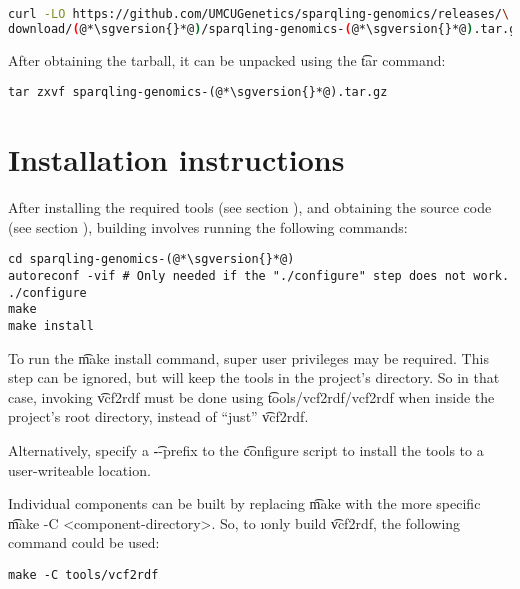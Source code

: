 \begin{lstlisting}[language=bash]
curl -LO https://github.com/UMCUGenetics/sparqling-genomics/releases/\
download/(@*\sgversion{}*@)/sparqling-genomics-(@*\sgversion{}*@).tar.gz
\end{lstlisting}

  After obtaining the tarball, it can be unpacked using the \t{tar}
  command:

\begin{lstlisting}
tar zxvf sparqling-genomics-(@*\sgversion{}*@).tar.gz
\end{lstlisting}

\section{Installation instructions}

  After installing the required tools (see section
  ), and obtaining the source code (see
  section \refer{sec:obtaining-tarball}), building involves running
  the following commands:

\begin{lstlisting}
cd sparqling-genomics-(@*\sgversion{}*@)
autoreconf -vif # Only needed if the "./configure" step does not work.
./configure
make
make install
\end{lstlisting}

  To run the \t{make install} command, super user privileges may be
  required.  This step can be ignored, but will keep the tools in the project's
  directory.  So in that case, invoking \t{vcf2rdf} must be done using
  \t{tools/vcf2rdf/vcf2rdf} when inside the project's root directory,
  instead of ``just'' \t{vcf2rdf}.

  Alternatively, specify a \t{-{}-prefix} to the \t{configure}
  script to install the tools to a user-writeable location.

  Individual components can be built by replacing \t{make} with the
  more specific \t{make -C <component-directory>}.  So, to \i{only}
  build \t{vcf2rdf}, the following command could be used:

\begin{lstlisting}
make -C tools/vcf2rdf
\end{lstlisting}
